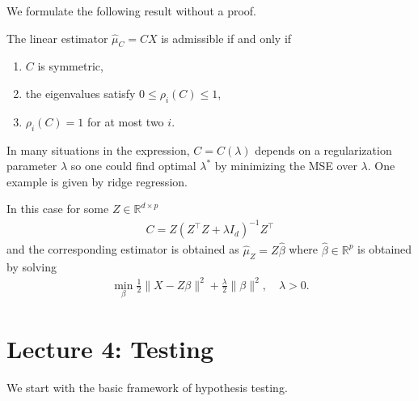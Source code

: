 We formulate the following result without a proof.
\begin{prop}
    The linear estimator $\widehat{\mu}_C=C X$ is admissible if and only if
    \begin{enumerate}
        \item $C$ is symmetric,
        \item the eigenvalues satisfy $0 \leq \rho_i(C) \leq 1$,
        \item $\rho_i(C)=1$ for at most two $i$.
    \end{enumerate}

\end{prop}

In many situations in the expression, $C=C(\lambda)$ depends on a regularization parameter $\lambda$ so one could find optimal $\lambda^*$ by minimizing the MSE over $\lambda$. One example is given by ridge regression. 

\begin{eg}
    In this case for some $Z \in \mathbb{R}^{d \times p}$
\begin{align*}
C=Z\left(Z^{\top} Z+\lambda I_d\right)^{-1} Z^{\top}
\end{align*}
and the corresponding estimator is obtained as $\widehat{\mu}_Z=Z \widehat{\beta}$ where $\widehat{\beta} \in \mathbb{R}^p$ is obtained by solving
\begin{align*}
\min _\beta \frac{1}{2}\|X-Z \beta\|^2+\frac{\lambda}{2}\|\beta\|^2, \quad \lambda>0 .
\end{align*}
\end{eg}

\section{Lecture 4: Testing}

We start with the basic framework of hypothesis testing.

